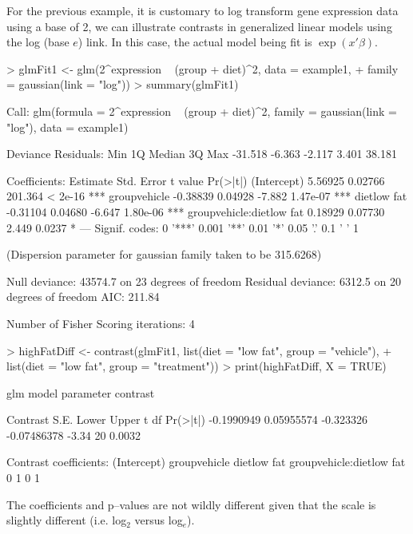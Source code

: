 \documentclass[12pt]{article}
\begin{document}
For the previous example, it is customary to log transform gene expression data using a base of 2, we can illustrate contrasts in generalized linear models using the log (base $e$) link. In this case, the actual model being fit is $\exp(x'\beta)$. 
{\small 
\begin{Schunk}
\begin{Sinput}
> glmFit1 <- glm(2^expression ~ (group + diet)^2, data = example1, 
+     family = gaussian(link = "log"))
> summary(glmFit1)
\end{Sinput}
\begin{Soutput}
Call:
glm(formula = 2^expression ~ (group + diet)^2, family = gaussian(link = "log"), 
    data = example1)

Deviance Residuals: 
    Min       1Q   Median       3Q      Max  
-31.518   -6.363   -2.117    3.401   38.181  

Coefficients:
                         Estimate Std. Error t value Pr(>|t|)    
(Intercept)               5.56925    0.02766 201.364  < 2e-16 ***
groupvehicle             -0.38839    0.04928  -7.882 1.47e-07 ***
dietlow fat              -0.31104    0.04680  -6.647 1.80e-06 ***
groupvehicle:dietlow fat  0.18929    0.07730   2.449   0.0237 *  
---
Signif. codes:  0 '***' 0.001 '**' 0.01 '*' 0.05 '.' 0.1 ' ' 1 

(Dispersion parameter for gaussian family taken to be 315.6268)

    Null deviance: 43574.7  on 23  degrees of freedom
Residual deviance:  6312.5  on 20  degrees of freedom
AIC: 211.84

Number of Fisher Scoring iterations: 4
\end{Soutput}
\begin{Sinput}
> highFatDiff <- contrast(glmFit1, list(diet = "low fat", group = "vehicle"), 
+     list(diet = "low fat", group = "treatment"))
> print(highFatDiff, X = TRUE)
\end{Sinput}
\begin{Soutput}
glm model parameter contrast

   Contrast       S.E.     Lower       Upper     t df Pr(>|t|)
 -0.1990949 0.05955574 -0.323326 -0.07486378 -3.34 20   0.0032

Contrast coefficients:
 (Intercept) groupvehicle dietlow fat groupvehicle:dietlow fat
           0            1           0                        1
\end{Soutput}
\end{Schunk}
}

The coefficients and p--values are not wildly different given that the scale is slightly different (i.e. log$_2$ versus log$_e$).
\end{document}
